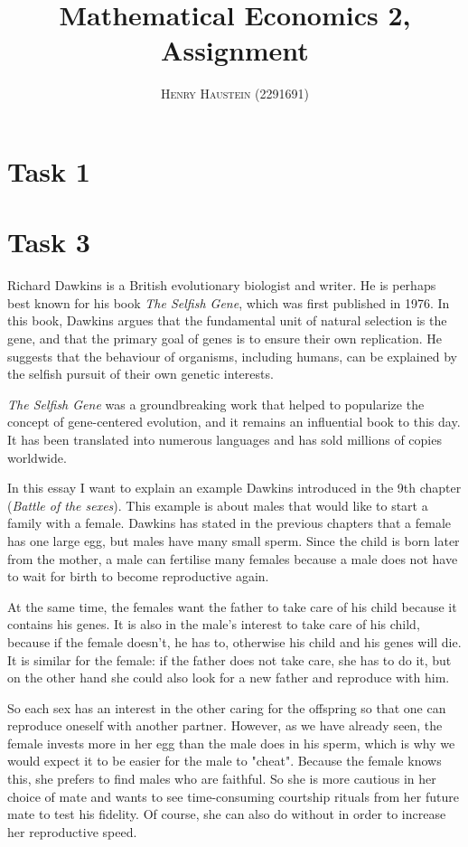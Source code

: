 \documentclass{article}
\title{\textbf{Mathematical Economics 2, Assignment}}
\author{\textsc{Henry Haustein} (2291691)}
\date{}
\begin{document}
	\maketitle
	
	\section*{Task 1}
	
	\section*{Task 3}
	
	Richard Dawkins is a British evolutionary biologist and writer. He is perhaps best known for his book \textit{The Selfish Gene}, which was first published in 1976. In this book, Dawkins argues that the fundamental unit of natural selection is the gene, and that the primary goal of genes is to ensure their own replication. He suggests that the behaviour of organisms, including humans, can be explained by the selfish pursuit of their own genetic interests.
	
	\textit{The Selfish Gene} was a groundbreaking work that helped to popularize the concept of gene-centered evolution, and it remains an influential book to this day. It has been translated into numerous languages and has sold millions of copies worldwide. %
	
	In this essay I want to explain an example Dawkins introduced in the 9th chapter (\textit{Battle of the sexes}). This example is about males that would like to start a family with a female. Dawkins has stated in the previous chapters that a female has one large egg, but males have many small sperm. Since the child is born later from the mother, a male can fertilise many females because a male does not have to wait for birth to become reproductive again.
	
	At the same time, the females want the father to take care of his child because it contains his genes. It is also in the male's interest to take care of his child, because if the female doesn't, he has to, otherwise his child and his genes will die. It is similar for the female: if the father does not take care, she has to do it, but on the other hand she could also look for a new father and reproduce with him.
	
	So each sex has an interest in the other caring for the offspring so that one can reproduce oneself with another partner. However, as we have already seen, the female invests more in her egg than the male does in his sperm, which is why we would expect it to be easier for the male to "cheat". Because the female knows this, she prefers to find males who are faithful. So she is more cautious in her choice of mate and wants to see time-consuming courtship rituals from her future mate to test his fidelity. Of course, she can also do without in order to increase her reproductive speed.
	
\end{document}
